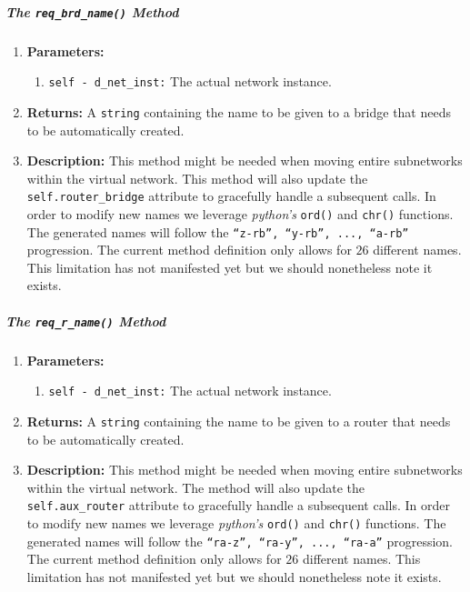         \subparagraph{The \texttt{req\_brd\_name()} Method}
            \begin{enumerate}
                \item \textbf{Parameters:}
                \begin{enumerate}
                    \item \texttt{self - d\_net\_inst:} The actual network instance.
                \end{enumerate}
                \item \textbf{Returns:} A \texttt{string} containing the name to be given to a bridge that needs to be automatically created.
                \item \textbf{Description:} This method might be needed when moving entire subnetworks within the virtual network. This method will also update the \texttt{self.router\_bridge} attribute to gracefully handle a subsequent calls. In order to modify new names we leverage \textit{python's} \texttt{ord()} \cite{bib:python-builtins} and \texttt{chr()} \cite{bib:python-builtins} functions. The generated names will follow the \texttt{``z-rb'', ``y-rb'', ..., ``a-rb''} progression. The current method definition only allows for $26$ different names. This limitation has not manifested yet but we should nonetheless note it exists.
            \end{enumerate}

        \subparagraph{The \texttt{req\_r\_name()} Method}
            \begin{enumerate}
                \item \textbf{Parameters:}
                \begin{enumerate}
                    \item \texttt{self - d\_net\_inst:} The actual network instance.
                \end{enumerate}
                \item \textbf{Returns:} A \texttt{string} containing the name to be given to a router that needs to be automatically created.
                \item \textbf{Description:} This method might be needed when moving entire subnetworks within the virtual network. The method will also update the \texttt{self.aux\_router} attribute to gracefully handle a subsequent calls. In order to modify new names we leverage \textit{python's} \texttt{ord()} \cite{bib:python-builtins} and \texttt{chr()} \cite{bib:python-builtins} functions. The generated names will follow the \texttt{``ra-z'', ``ra-y'', ..., ``ra-a''} progression. The current method definition only allows for $26$ different names. This limitation has not manifested yet but we should nonetheless note it exists.
            \end{enumerate}

